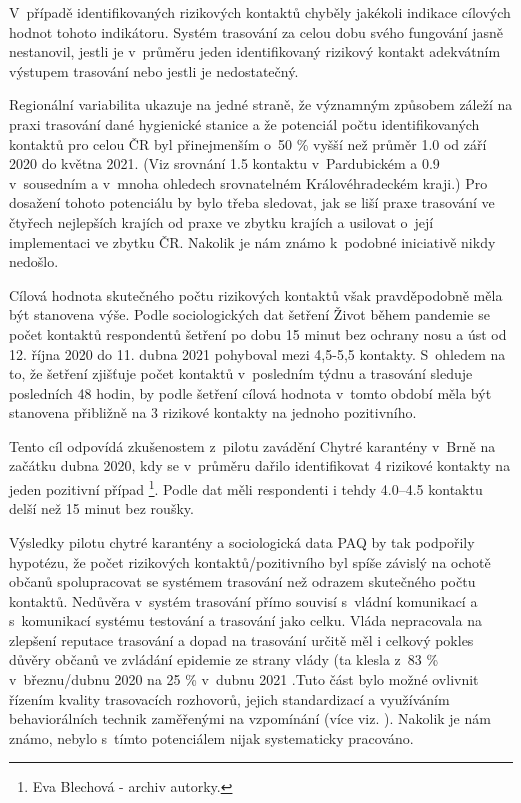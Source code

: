 V~případě identifikovaných rizikových kontaktů chyběly jakékoli indikace cílových hodnot tohoto indikátoru. Systém trasování za celou dobu svého fungování jasně nestanovil, jestli je v~průměru jeden identifikovaný rizikový kontakt adekvátním výstupem trasování nebo jestli je nedostatečný.

Regionální variabilita ukazuje na jedné straně, že významným způsobem záleží na praxi trasování dané hygienické stanice a že potenciál počtu identifikovaných kontaktů pro celou ČR byl přinejmenším o~50 \% vyšší než průměr 1.0 od září 2020 do května 2021. (Viz srovnání 1.5 kontaktu v~Pardubickém a 0.9 v~sousedním a v~mnoha ohledech srovnatelném Královéhradeckém kraji.) Pro dosažení tohoto potenciálu by bylo třeba sledovat, jak se liší praxe trasování ve čtyřech nejlepších krajích od praxe ve zbytku krajích a usilovat o~její implementaci ve zbytku ČR. Nakolik je nám známo k~podobné iniciativě nikdy nedošlo.

Cílová hodnota skutečného počtu rizikových kontaktů však pravděpodobně měla být stanovena výše. Podle sociologických dat šetření Život během pandemie \cite{tr_PAQ01} se počet kontaktů respondentů šetření po dobu 15 minut bez ochrany nosu a úst od 12. října 2020 do 11. dubna 2021 pohyboval mezi 4,5-5,5 kontakty. S~ohledem na to, že šetření zjišťuje počet kontaktů v~posledním týdnu a trasování sleduje posledních 48 hodin, by podle šetření cílová hodnota v~tomto období měla být stanovena přibližně na 3 rizikové kontakty na jednoho pozitivního.

Tento cíl odpovídá zkušenostem z~pilotu zavádění Chytré karantény v~Brně na začátku dubna 2020, kdy se v~průměru dařilo identifikovat 4 rizikové kontakty na jeden pozitivní případ \footnote{Eva Blechová - archiv autorky.}. Podle dat \cite{tr_PAQ01} měli respondenti i tehdy 4.0--4.5 kontaktu delší než 15 minut bez roušky.

Výsledky pilotu chytré karantény a sociologická data PAQ by tak podpořily hypotézu, že počet rizikových kontaktů/pozitivního byl spíše závislý na ochotě občanů spolupracovat se systémem trasování než odrazem skutečného počtu kontaktů. Ne\-dů\-věra v~systém trasování přímo souvisí s~vládní komunikací a s~komunikací systému testování a trasování jako celku. Vláda nepracovala na zlepšení reputace trasování \cite{tr_bisop01} a dopad na trasování určitě měl i celkový pokles důvěry občanů ve zvládání epidemie ze strany vlády (ta klesla z~83 \% v~březnu/dubnu 2020 na 25 \% v~dubnu 2021 \cite{tr_STEM}.Tuto část bylo možné ovlivnit řízením kvality trasovacích rozhovorů, jejich standardizací a využíváním behaviorálních technik zaměřenými na vzpomínání (více viz. \cite{tr_bisop06}). Nakolik je nám známo, nebylo s~tímto potenciálem nijak systematicky pracováno.

